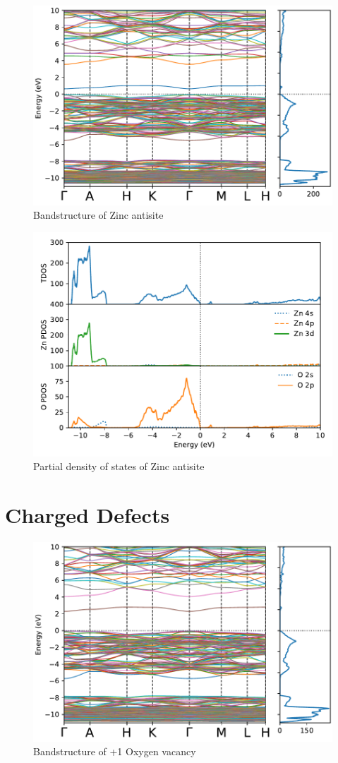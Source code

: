 \begin{figure}[tbh!]
	\centering
	\includegraphics[width=0.7\linewidth]{"images/rnd/band-dos_Zn_anti"}
	\caption[Bandstructure of Zinc antisite]{Bandstructure of Zinc antisite}
\end{figure}

\begin{figure}[tbh!]
	\centering
	\includegraphics[width=0.7\linewidth]{"images/rnd/dos-pdos_Zn_anti"}
	\caption[Partial density of states of Zinc antisite]{Partial density of states of Zinc antisite}
\end{figure}


\clearpage
\section{Charged Defects}
\begin{figure}[tbh!]
	\centering
	\includegraphics[width=0.7\linewidth]{"images/rnd/band-dos_O_vac-p1"}
	\caption[Bandstructure of +1 Oxygen vacancy]{Bandstructure of +1 Oxygen vacancy}
\end{figure}


